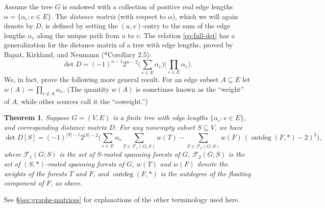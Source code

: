 \documentclass[12pt]{amsart}
\newtheorem{thm}{Theorem}[section]
\theoremstyle{definition}
\newcommand{\Da}{{D}}
\newcommand{\trees}{\mathcal{F}_1}
\newcommand{\forests}{\mathcal{F}}
\DeclareMathOperator{\outdeg}{outdeg}
\begin{document}
Assume the tree $G$ is endowed with a collection of positive real edge lengths $\alpha = \{\alpha_e \colon e\in E\}$. 
The {\em distance matrix} (with respect to $\alpha$), which we will again denote by $\Da$, is defined by setting the $(u,v)$-entry to the sum of the edge lengths $\alpha_e$ along the unique path from $u$ to $v$.
The relation \eqref{eq:full-det} has a generalization for the distance matrix of a tree with edge lengths, proved by Bapat, Kirkland, and Neumann (\cite{bapat-kirkland-neumann}*{Corollary 2.5}):
\begin{equation}\label{eq:w-full-det}
	\det \Da = (-1)^{n-1} 2^{n-2} \Big(\sum_{e \in E} \alpha_e\Big) \Big( \prod_{e \in E} \alpha_e \Big).
\end{equation}
We, in fact, prove the following more general result. 
For an edge subset $A \subseteq E$ 
let $w(A) = \prod_{e \not\in A} \alpha_e$.
(The quantity $w(A)$ is sometimes known as the ``weight'' of $A$, while other sources call it the ``coweight.'')
\begin{thm}
\label{thm:w-main}
Suppose $G = (V,E)$ is a finite tree with edge lengths $\{\alpha_e \colon e \in E\}$, and corresponding distance matrix $\Da$. 
For any nonempty subset $S \subseteq V$, we have
\begin{equation}\label{eq:w-main}
	\det \Da[S] = (-1)^{|S|-1} 2^{|S|-2} \Bigg( \sum_{e \in E}\alpha_e \!\!\!\! \sum_{T \in \trees(G;S)} \!\! w(T) - \!\!\!\!\sum_{F \in \forests_2(G;S)} \!\!w(F)\, (\outdeg(F,*) - 2)^2 \!\Bigg),
\end{equation}
where 
$\trees(G;S)$ is the set of $S$-rooted spanning forests of $G$,
$\forests_2(G;S)$ is the set of $(S,*)$-rooted spanning forests of $G$,
$w(T)$ and $w(F)$ denote the weights of the forests $T$ and $F$,
and 
$\outdeg(F, *)$ is the outdegree of the floating component of $F$, as above.
\end{thm}
See \S\ref{sec:graphs-matrices} for explanations of the other terminology used here.
\end{document}
